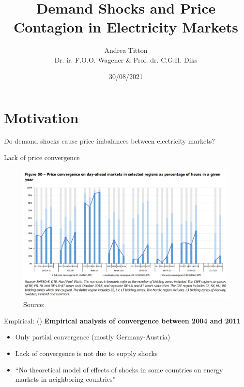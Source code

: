 \documentclass{beamer}
\author[Andrea Titton]{Andrea Titton\\[1ex]  {\small Dr. ir. F.O.O. Wagener \& Prof. dr. C.G.H. Diks}}
\title{Demand Shocks and Price Contagion in Electricity Markets}
\institute{Tinbergen Institute}
\date{30/08/2021}
\begin{document}

\frame{\titlepage}

\begin{frame}
    \tableofcontents
\end{frame}

\section{Motivation}

\begin{frame}
    Do demand shocks cause price imbalances between electricity markets?
\end{frame}

\begin{frame}{Lack of price convergence}
    \begin{figure}
        \includegraphics[height = 0.7\textheight]{figures/convergence.PNG}
        \\ Source: \cite{Report2019}
    \end{figure}
\end{frame}

\begin{frame}{Empirical: \citeauthor{Bockers2014} (\citeyear{Bockers2014})}
    \textbf{Empirical analysis of convergence between 2004 and 2011}

    \begin{itemize} \setlength\itemsep{1.5em}
              \pause \item Only partial convergence (mostly Germany-Austria)
              \pause \item Lack of convergence is not due to supply shocks
              \pause \item ``No theoretical model of effects of shocks in some countries on energy markets in neighboring countries''
    \end{itemize}

\end{frame}
\end{document}
